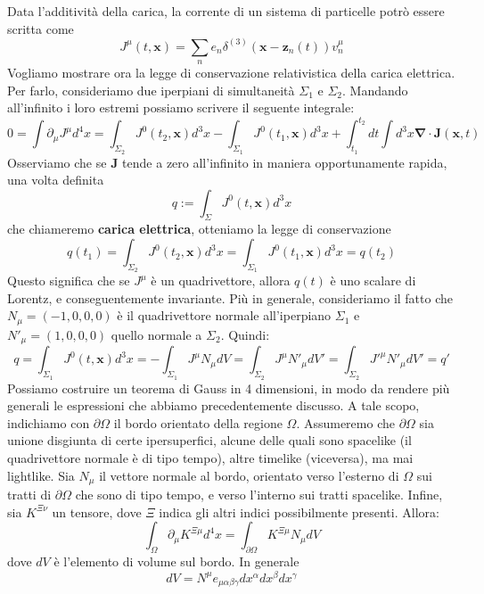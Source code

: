 \documentclass[a4paper,11pt]{book}
\theoremstyle{plain}
\theoremstyle{definition}
\begin{document}
Data l'additività della carica, la corrente di un sistema di particelle potrò essere scritta come
\begin{equation}
J^{\mu}(t,\textbf{x})=\sum_n e_n \delta^{(3)}(\textbf{x}-\textbf{z}_n(t))v^{\mu}_n
\end{equation}
Vogliamo mostrare ora la legge di conservazione relativistica della carica elettrica. Per farlo, consideriamo due iperpiani di simultaneità $\Sigma_1$ e $\Sigma_2$. Mandando all'infinito i loro estremi possiamo scrivere il seguente integrale:
\[
0=\int \partial_{\mu}J^{\mu}d^4x=\int_{\Sigma_2}J^0(t_2,\textbf{x})d^3x-\int_{\Sigma_1}J^0(t_1,\textbf{x})d^3x+\int_{t_1}^{t_2}dt \int d^3x \boldsymbol{\nabla}\cdot\textbf{J}(\textbf{x},t)
\]
Osserviamo che se $\textbf{J}$ tende a zero all'infinito in maniera opportunamente rapida, una volta definita
\[
q:=\int_{\Sigma}J^0(t,\textbf{x})d^3x
\]
che chiameremo \textbf{carica elettrica}, otteniamo la legge di conservazione
\begin{equation}
q(t_1)=\int_{\Sigma_2}J^0(t_2,\textbf{x})d^3x = \int_{\Sigma_1}J^0(t_1,\textbf{x})d^3x = q(t_2)
\end{equation}
Questo significa che se $J^{\mu}$ è un quadrivettore, allora $q(t)$ è uno scalare di Lorentz, e conseguentemente invariante. Più in generale, consideriamo il fatto che $N_{\mu}=(-1,0,0,0)$ è il quadrivettore normale all'iperpiano $\Sigma_1$ e $N'_{\mu}=(1,0,0,0)$ quello normale a $\Sigma_2$. Quindi:
\[
q=\int_{\Sigma_1}J^0(t,\textbf{x})d^3x=-\int_{\Sigma_1}J^{\mu}N_{\mu}dV=\int_{\Sigma_2} J^{\mu}N'_{\mu}dV'=\int_{\Sigma_2}J'^{\mu}N'_{\mu}dV'=q'
\]
Possiamo costruire un teorema di Gauss in 4 dimensioni, in modo da rendere più generali le espressioni che abbiamo precedentemente discusso. A tale scopo, indichiamo con $\partial \Omega$ il bordo orientato della regione $\Omega$. Assumeremo che $\partial \Omega$ sia unione disgiunta di certe ipersuperfici, alcune delle quali sono spacelike (il quadrivettore normale è di tipo tempo), altre timelike (viceversa), ma mai lightlike. Sia $N_{\mu}$ il vettore normale al bordo, orientato verso l'esterno di $\Omega$ sui tratti di $\partial \Omega$ che sono di tipo tempo, e verso l'interno sui tratti spacelike. Infine, sia $K^{\Xi \nu}$ un tensore, dove $\Xi$ indica gli altri indici possibilmente presenti. Allora:
\begin{equation}
\int_{\Omega} \partial_{\mu}K^{\Xi \mu}d^4x = \int_{\partial\Omega}K^{\Xi\mu}N_{\mu}dV
\end{equation}
dove $dV$ è l'elemento di volume sul bordo. In generale
\[
dV=N^{\mu}e_{\mu\alpha\beta\gamma}dx^{\alpha}dx^{\beta}dx^{\gamma}
\]
\end{document}
